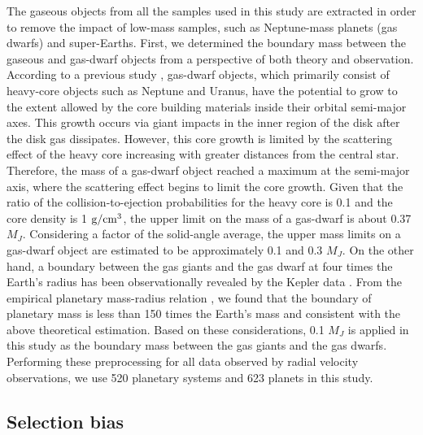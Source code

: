 \documentclass[twocolumn, dvipdfmx]{aastex62}
\begin{document}
\begin{CJK*}{UTF8}{min}
The gaseous objects from all the samples used in this study are extracted in order to remove the impact of low-mass samples, such as Neptune-mass planets (gas dwarfs) and super-Earths. First, we determined the boundary mass between the gaseous and gas-dwarf objects from a perspective of both theory and observation. According to a previous study \citep{2004ApJ...604..388I}, gas-dwarf objects, which primarily consist of heavy-core objects such as Neptune and Uranus, have the potential to grow to the extent allowed by the core building materials inside their orbital semi-major axes. This growth occurs via giant impacts in the inner region of the disk after the disk gas dissipates. However, this core growth is limited by the scattering effect of the heavy core increasing with greater distances from the central star. Therefore, the mass of a gas-dwarf object reached a maximum at the semi-major axis, where the scattering effect begins to limit the core growth. Given that the ratio of the collision-to-ejection probabilities for the heavy core is 0.1 and the core density is 1 $\rm g/cm^3$, the upper limit on the mass of a gas-dwarf is about 0.37 $M_J$. Considering a factor of the solid-angle average, the upper mass limits on a gas-dwarf object are estimated to be approximately 0.1 and 0.3 $M_J$. On the other hand, a boundary between the gas giants and the gas dwarf at four times the Earth's radius has been observationally revealed by the Kepler data \citep{2012Natur.486..375B}. From the empirical planetary mass-radius relation \cite{2013ApJ...768...14W}, we found that the boundary of planetary mass is less than 150 times the Earth's mass and consistent with the above theoretical estimation. Based on these considerations, 0.1 $M_J$ is applied in this study as the boundary mass between the gas giants and the gas dwarfs. Performing these preprocessing for all data observed by radial velocity observations, we use 520 planetary systems and 623 planets in this study.


\subsection{Selection bias} \label{subsec:bias}


\end{CJK*}
\end{document}
